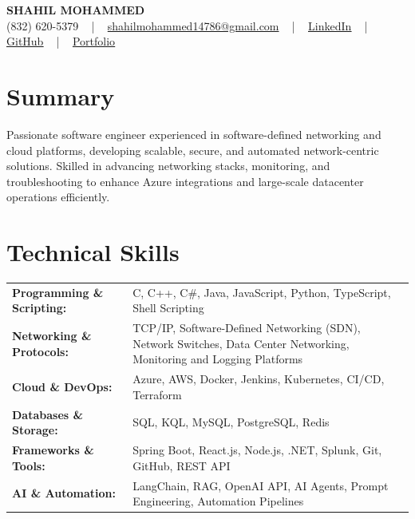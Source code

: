 \documentclass[letterpaper,11pt]{article}
\begin{document}
\begin{center}
    {\fontsize{14pt}{12pt}\selectfont \textbf{\MakeUppercase{Shahil Mohammed}}}\\ \vspace{2pt}
    \fontsize{10pt}{12pt}\selectfont (832) 620-5379 ~ | ~ \href{mailto:shahilmohammed14786@gmail.com}{shahilmohammed14786@gmail.com} ~ | ~  
    \href{https://www.linkedin.com/in/shahil-mohammed-9652931a1/}{\color{blue}\underline{LinkedIn}}  ~ | ~ 
    \href{https://github.com/freakbeast14}{\color{blue}\underline{GitHub}} ~ | ~ 
    \href{https://shahil-mohammed.netlify.app/}{\color{blue}\underline{Portfolio}}
    \vspace{-8pt}
\end{center}

\section{Summary}
\fontsize{9pt}{10pt}\selectfont
Passionate software engineer experienced in software-defined networking and cloud platforms, developing scalable, secure, and automated network-centric solutions. Skilled in advancing networking stacks, monitoring, and troubleshooting to enhance Azure integrations and large-scale datacenter operations efficiently.
 \vspace{-5pt}
 
\section{Technical Skills}
        \vspace{-14pt}
        \begin{table}[h]
            \fontsize{9pt}{10pt}\selectfont
            \begin{tabular}{p{0.3\linewidth} p{0.7\linewidth}}
                \textbf{Programming \& Scripting:} & C, C++, C\#, Java, JavaScript, Python, TypeScript, Shell Scripting \\
                \textbf{Networking \& Protocols:} & TCP/IP, Software-Defined Networking (SDN), Network Switches, Data Center Networking, Monitoring and Logging Platforms \\
                \textbf{Cloud \& DevOps:} & Azure, AWS, Docker, Jenkins, Kubernetes, CI/CD, Terraform \\
                \textbf{Databases \& Storage:} & SQL, KQL, MySQL, PostgreSQL, Redis \\
                \textbf{Frameworks \& Tools:} & Spring Boot, React.js, Node.js, .NET, Splunk, Git, GitHub, REST API \\
                \textbf{AI \& Automation:} & LangChain, RAG, OpenAI API, AI Agents, Prompt Engineering, Automation Pipelines \\
            \end{tabular}
        \end{table}
 \vspace{-15pt}
 
\end{document}
